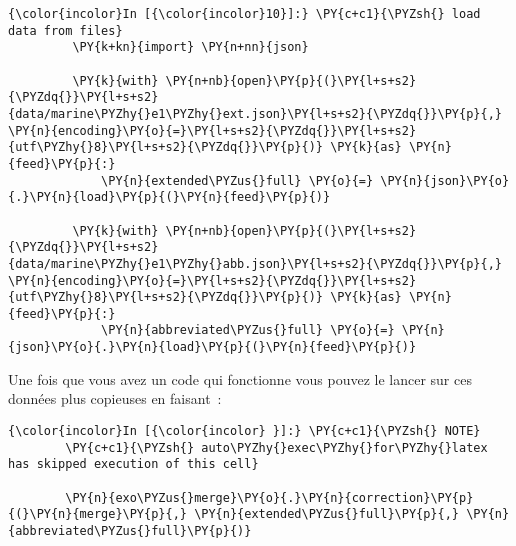     \begin{Verbatim}[commandchars=\\\{\},frame=single,framerule=0.3mm,rulecolor=\color{cellframecolor}]
{\color{incolor}In [{\color{incolor}10}]:} \PY{c+c1}{\PYZsh{} load data from files}
         \PY{k+kn}{import} \PY{n+nn}{json}
         
         \PY{k}{with} \PY{n+nb}{open}\PY{p}{(}\PY{l+s+s2}{\PYZdq{}}\PY{l+s+s2}{data/marine\PYZhy{}e1\PYZhy{}ext.json}\PY{l+s+s2}{\PYZdq{}}\PY{p}{,} \PY{n}{encoding}\PY{o}{=}\PY{l+s+s2}{\PYZdq{}}\PY{l+s+s2}{utf\PYZhy{}8}\PY{l+s+s2}{\PYZdq{}}\PY{p}{)} \PY{k}{as} \PY{n}{feed}\PY{p}{:}
             \PY{n}{extended\PYZus{}full} \PY{o}{=} \PY{n}{json}\PY{o}{.}\PY{n}{load}\PY{p}{(}\PY{n}{feed}\PY{p}{)}
         
         \PY{k}{with} \PY{n+nb}{open}\PY{p}{(}\PY{l+s+s2}{\PYZdq{}}\PY{l+s+s2}{data/marine\PYZhy{}e1\PYZhy{}abb.json}\PY{l+s+s2}{\PYZdq{}}\PY{p}{,} \PY{n}{encoding}\PY{o}{=}\PY{l+s+s2}{\PYZdq{}}\PY{l+s+s2}{utf\PYZhy{}8}\PY{l+s+s2}{\PYZdq{}}\PY{p}{)} \PY{k}{as} \PY{n}{feed}\PY{p}{:}
             \PY{n}{abbreviated\PYZus{}full} \PY{o}{=} \PY{n}{json}\PY{o}{.}\PY{n}{load}\PY{p}{(}\PY{n}{feed}\PY{p}{)}
\end{Verbatim}


    Une fois que vous avez un code qui fonctionne vous pouvez le lancer sur
ces données plus copieuses en faisant~:

    \begin{Verbatim}[commandchars=\\\{\},frame=single,framerule=0.3mm,rulecolor=\color{cellframecolor}]
{\color{incolor}In [{\color{incolor} }]:} \PY{c+c1}{\PYZsh{} NOTE}
        \PY{c+c1}{\PYZsh{} auto\PYZhy{}exec\PYZhy{}for\PYZhy{}latex has skipped execution of this cell}
        
        \PY{n}{exo\PYZus{}merge}\PY{o}{.}\PY{n}{correction}\PY{p}{(}\PY{n}{merge}\PY{p}{,} \PY{n}{extended\PYZus{}full}\PY{p}{,} \PY{n}{abbreviated\PYZus{}full}\PY{p}{)}
\end{Verbatim}



    
    
    
